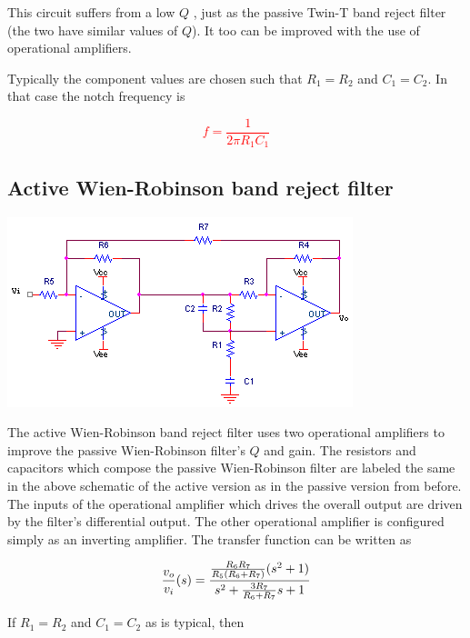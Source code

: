 This circuit suffers from a low $Q$ \autocite[323]{op-amps-for-everyone}, just as the passive Twin-T band reject filter (the two have similar values of $Q$).
It too can be improved with the use of operational amplifiers.

Typically the component values are chosen such that $R_1 = R_2$ and $C_1 = C_2$.
In that case the notch frequency \autocite[324]{op-amps-for-everyone} is

\textcolor{red}{
\begin{equation}
f = \frac{1}{2\pi R_1 C_1}
\label{eq:passiveWienRobinson}
\end{equation}
}

\subsection{Active Wien-Robinson band reject filter}
\begin{center}
	\includegraphics{schematics/activeWien-Robinsonbandrejectfilter.PNG}
\end{center}
The active Wien-Robinson band reject filter uses two operational amplifiers to improve the passive Wien-Robinson filter's $Q$ and gain.
The resistors and capacitors which compose the passive Wien-Robinson filter are labeled the same in the above schematic of the active version as in the passive version from before.
The inputs of the operational amplifier which drives the overall output are driven by the filter's differential output.
The other operational amplifier is configured simply as an inverting amplifier.
The transfer function \autocite[323]{op-amps-for-everyone} can be written as

\textcolor{red}{
\begin{equation}
\frac{\vout}{\vin}(s) = \frac{\frac{R_6 R_7}{R_5(R_6 + R_7)}(s^2 + 1)}{s^2 +\frac{3R_7}{R_6 + R_7}s+1}
\label{eq:activeWienRobinsonbandreject}
\end{equation}
}

If $R_1 = R_2$ and $C_1 = C_2$ as is typical, then

